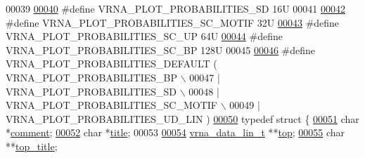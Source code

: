 \begin{DoxyCode}
00039 
\mbox{\hyperlink{group__plotting__utils_ga78f8da179bc3f52b1c1180931ed8b0f7}{00040}} \textcolor{preprocessor}{#define VRNA\_PLOT\_PROBABILITIES\_SD        16U}
00041 
\mbox{\hyperlink{group__plotting__utils_ga228fe1c75b71cb40726b9423d2bed2a9}{00042}} \textcolor{preprocessor}{#define VRNA\_PLOT\_PROBABILITIES\_SC\_MOTIF  32U}
\mbox{\hyperlink{group__plotting__utils_ga41a92625e75a77555b3f6e3a0ef7b89b}{00043}} \textcolor{preprocessor}{#define VRNA\_PLOT\_PROBABILITIES\_SC\_UP     64U}
\mbox{\hyperlink{group__plotting__utils_ga886fa0619733b98667111faa56cd03d6}{00044}} \textcolor{preprocessor}{#define VRNA\_PLOT\_PROBABILITIES\_SC\_BP     128U}
00045 
\mbox{\hyperlink{group__plotting__utils_gaa3a3d5cf87de5120a93eab3be788b6fb}{00046}} \textcolor{preprocessor}{#define VRNA\_PLOT\_PROBABILITIES\_DEFAULT   (   VRNA\_PLOT\_PROBABILITIES\_BP \(\backslash\)}
00047 \textcolor{preprocessor}{                                            | VRNA\_PLOT\_PROBABILITIES\_SD \(\backslash\)}
00048 \textcolor{preprocessor}{                                            | VRNA\_PLOT\_PROBABILITIES\_SC\_MOTIF \(\backslash\)}
00049 \textcolor{preprocessor}{                                            | VRNA\_PLOT\_PROBABILITIES\_UD\_LIN )}
\mbox{\hyperlink{group__plotting__utils}{00050}} \textcolor{keyword}{typedef} \textcolor{keyword}{struct }\{
\mbox{\hyperlink{group__plotting__utils_a244ff5044623adbb46db61f89a812f4c}{00051}}   \textcolor{keywordtype}{char}            *\mbox{\hyperlink{group__plotting__utils_a244ff5044623adbb46db61f89a812f4c}{comment}};
\mbox{\hyperlink{group__plotting__utils_a651c8b62c91f07056a2018219f9e3834}{00052}}   \textcolor{keywordtype}{char}            *\mbox{\hyperlink{group__plotting__utils_a651c8b62c91f07056a2018219f9e3834}{title}};
00053 
\mbox{\hyperlink{group__plotting__utils_a5834cd1f871a38c76c91560679864a44}{00054}}   \mbox{\hyperlink{group__data__structures_structvrna__data__linear__s}{vrna\_data\_lin\_t}} **\mbox{\hyperlink{group__plotting__utils_a5834cd1f871a38c76c91560679864a44}{top}};
\mbox{\hyperlink{group__plotting__utils_a9614c3ff559137f289d318b5a90bab05}{00055}}   \textcolor{keywordtype}{char}            **\mbox{\hyperlink{group__plotting__utils_a9614c3ff559137f289d318b5a90bab05}{top\_title}};

\end{DoxyCode}
